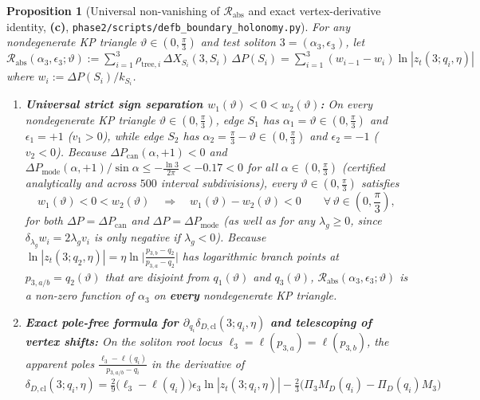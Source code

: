 \documentclass[11pt,a4paper]{article}
\newtheorem{proposition}[theorem]{Proposition}
\theoremstyle{remark}
\newcommand{\Lc}{\textbf{(c)}}
\newcommand{\shol}{\texttt{phase2/\allowbreak scripts/\allowbreak defb\_\allowbreak boundary\_\allowbreak holonomy.py}}
\begin{document}
\begin{proposition}[Universal non-vanishing of $\mathcal{R}_{\mathrm{abs}}$ and exact vertex-derivative identity, \Lc, \shol]\label{prop:universal_Rabs}
For any nondegenerate KP triangle $\vartheta \in (0,\frac{\pi}{3})$ and test
soliton $3 = (\alpha_3,\epsilon_3)$, let
$\mathcal{R}_{\mathrm{abs}}(\alpha_3,\epsilon_3;\vartheta) := \sum_{i=1}^3 \rho_{\mathrm{tree},i}\,\Delta X_{S_i}(3,S_i)\,\Delta P(S_i) = \sum_{i=1}^3 (w_{i-1} - w_i)\ln|z_t(3;q_i,\eta)|$
where $w_i := \Delta P(S_i)/k_{S_i}$.
\begin{enumerate}
\item \textbf{Universal strict sign separation $w_1(\vartheta) < 0 < w_2(\vartheta)$:}
On every nondegenerate KP triangle $\vartheta \in (0,\frac{\pi}{3})$, edge $S_1$
has $\alpha_1 = \vartheta \in (0,\frac{\pi}{3})$ and $\epsilon_1 = +1$ ($v_1 > 0$),
while edge $S_2$ has $\alpha_2 = \frac{\pi}{3}-\vartheta \in (0,\frac{\pi}{3})$
and $\epsilon_2 = -1$ ($v_2 < 0$). Because $\Delta P_{\mathrm{can}}(\alpha,+1) < 0$
and $\Delta P_{\mathrm{mode}}(\alpha,+1) / \sin\alpha \le -\frac{\ln 3}{2\pi} < -0.17 < 0$
for all $\alpha \in (0,\frac{\pi}{3})$ (certified analytically and across $500$
interval subdivisions), every $\vartheta \in (0,\frac{\pi}{3})$ satisfies
\begin{equation}\label{eq:w1_lt_w2}
  \boxed{\;
  w_1(\vartheta) < 0 < w_2(\vartheta) \quad\Longrightarrow\quad
  w_1(\vartheta) - w_2(\vartheta) < 0 \qquad
  \forall\,\vartheta \in \left(0,\frac{\pi}{3}\right),
  \;}
\end{equation}
for \emph{both} $\Delta P = \Delta P_{\mathrm{can}}$ and
$\Delta P = \Delta P_{\mathrm{mode}}$ (as well as for any $\lambda_g \ge 0$,
since $\delta_{\lambda_g}w_i = 2\lambda_g v_i$ is only negative if $\lambda_g<0$).
Because $\ln|z_t(3;q_2,\eta)| = \eta\ln\big|\frac{p_{3,b}-q_2}{p_{3,a}-q_2}\big|$
has logarithmic branch points at $p_{3,a/b} = q_2(\vartheta)$ that are disjoint
from $q_1(\vartheta)$ and $q_3(\vartheta)$, $\mathcal{R}_{\mathrm{abs}}(\alpha_3,\epsilon_3;\vartheta)$
is a non-zero function of $\alpha_3$ on \textbf{every} nondegenerate KP
triangle.
\item \textbf{Exact pole-free formula for $\partial_{q_i}\delta_{D,\mathrm{cl}}(3;q_i,\eta)$
and telescoping of vertex shifts:}
On the soliton root locus $\ell_3 = \ell(p_{3,a}) = \ell(p_{3,b})$, the apparent
poles $\frac{\ell_3 - \ell(q_i)}{p_{3,a/b}-q_i}$ in the derivative of
$\delta_{D,\mathrm{cl}}(3;q_i,\eta) = \frac{2}{9}\big(\ell_3 - \ell(q_i)\big)\epsilon_3\ln|z_t(3;q_i,\eta)| - \frac{2}{3}\big(\Pi_3 M_D(q_i) - \Pi_D(q_i)M_3\big)$

\end{enumerate}
\end{proposition}
\end{document}
